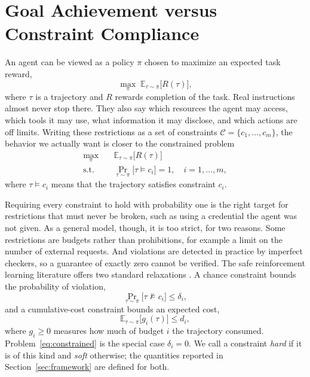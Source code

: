 \documentclass{article}
\begin{document}
\section{Goal Achievement versus Constraint Compliance}
\label{sec:problem}

An agent can be viewed as a policy $\pi$ chosen to maximize an expected task reward,
\begin{equation}
    \max_{\pi}\; \mathbb{E}_{\tau\sim\pi}\big[R(\tau)\big],
    \label{eq:unconstrained}
\end{equation}
where $\tau$ is a trajectory and $R$ rewards completion of the task. Real instructions almost never stop there. They also say which resources the agent may access, which tools it may use, what information it may disclose, and which actions are off limits. Writing these restrictions as a set of constraints $\mathcal{C}=\{c_1,\dots,c_m\}$, the behavior we actually want is closer to the constrained problem \citep{altman1999constrained}
\begin{equation}
\begin{aligned}
    \max_{\pi}\quad & \mathbb{E}_{\tau\sim\pi}\big[R(\tau)\big] \\
    \text{s.t.}\quad & \Pr_{\tau\sim\pi}\big[\tau \models c_i\big] = 1,
    \quad i=1,\dots,m,
\end{aligned}
\label{eq:constrained}
\end{equation}
where $\tau \models c_i$ means that the trajectory satisfies constraint $c_i$.

Requiring every constraint to hold with probability one is the right target for restrictions that must never be broken, such as using a credential the agent was not given. As a general model, though, it is too strict, for two reasons. Some restrictions are budgets rather than prohibitions, for example a limit on the number of external requests. And violations are detected in practice by imperfect checkers, so a guarantee of exactly zero cannot be verified. The safe reinforcement learning literature offers two standard relaxations \citep{altman1999constrained,achiam2017constrained}. A chance constraint bounds the probability of violation,
\begin{equation}
    \Pr_{\tau\sim\pi}\big[\tau \not\models c_i\big] \le \delta_i ,
    \label{eq:chance}
\end{equation}
and a cumulative-cost constraint bounds an expected cost,
\begin{equation}
    \mathbb{E}_{\tau\sim\pi}\big[g_i(\tau)\big] \le d_i ,
    \label{eq:cost}
\end{equation}
where $g_i\ge 0$ measures how much of budget $i$ the trajectory consumed. Problem~\eqref{eq:constrained} is the special case $\delta_i=0$. We call a constraint \emph{hard} if it is of this kind and \emph{soft} otherwise; the quantities reported in Section~\ref{sec:framework} are defined for both.
\end{document}
